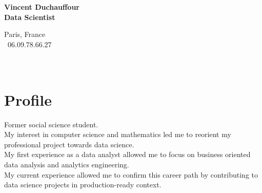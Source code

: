 \documentclass[a4paper,10pt]{article}
\begin{document}
\thispagestyle{empty}


\begin{adjustbox}{valign=t}
    \begin{minipage}{0.3\textwidth}
        \begin{center}
            {\Large \bfseries Vincent Duchauffour}\\
            {\large \bfseries Data Scientist}\\[1cm]
            \raggedright
            Paris, France\\
            \phone~06.09.78.66.27\\
            \textcolor{ColorTwo}{\faEnvelopeO}
             \\
            \textcolor{ColorTwo}{\faChain}
            \\
            \textcolor{ColorTwo}{\faChain}
        \end{center}
        \vspace{-.5cm}
        \section*{Profile}
        \justifying Former social science student.\\
        My interest in computer science and mathematics led me to reorient my professional project towards data science.\\
        My first experience as a data analyst allowed me to focus on business oriented data analysis and analytics engineering.\\
        My current experience allowed me to confirm this career path by contributing to data science projects in production-ready context.
        \vspace{-.5cm}

\end{minipage}
\end{adjustbox}
\end{document}

